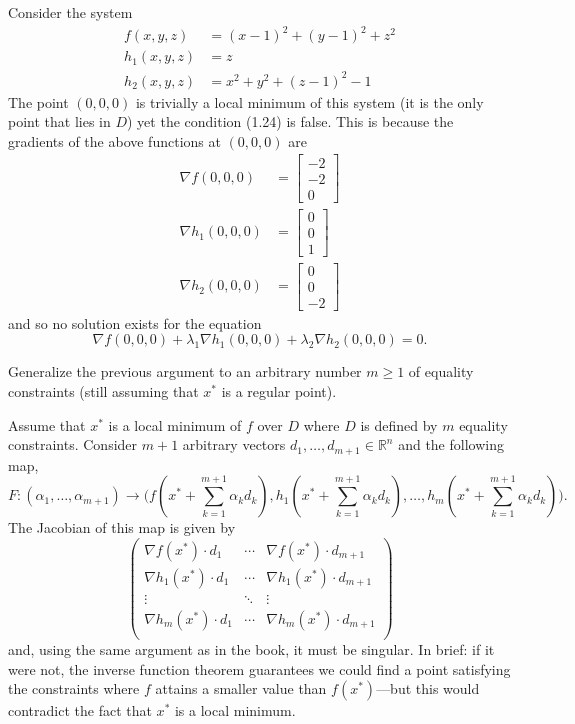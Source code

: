 \documentclass[../calculus-of-variations-and-optimal-control-theory.tex]{subfiles}
\begin{document}
\begin{questions}
\begin{solution}
	Consider the system
	\begin{align*}
		f(x, y, z) &= (x - 1)^2 + (y - 1)^2 + z^2 \\
		h_1(x, y, z) &= z \\
		h_2(x, y, z) &= x^2 + y^2 + (z - 1)^2 - 1
	\end{align*}
	The point $(0, 0, 0)$ is trivially a local minimum of this system (it is the only point that lies in $D$) yet the condition (1.24) is false. This is because the gradients of the above functions at $(0, 0, 0)$ are
	\begin{align*}
		\nabla f(0, 0, 0) &= \begin{bmatrix}
			-2 \\ -2 \\ 0
		\end{bmatrix} \\
		\nabla h_1(0, 0, 0) &= \begin{bmatrix}
			0 \\ 0 \\ 1
		\end{bmatrix} \\
		\nabla h_2(0, 0, 0) &= \begin{bmatrix}
			0 \\ 0 \\ -2
		\end{bmatrix}
	\end{align*}
	and so no solution exists for the equation
	\[
		\nabla f(0, 0, 0) + \lambda_1\nabla h_1(0, 0, 0) + \lambda_2\nabla h_2(0, 0, 0) = 0.
	\]
\end{solution}

\question Generalize the previous argument to an arbitrary number $m \geq 1$ of equality constraints (still assuming that $x^*$ is a regular point).

\begin{solution}
	Assume that $x^*$ is a local minimum of $f$ over $D$ where $D$ is defined by $m$ equality constraints. Consider $m+1$ arbitrary vectors $d_1,\dots,d_{m+1}\in\mathbb{R}^n$ and the following map,
	\[
		F : (\alpha_1,\dots,\alpha_{m+1}) \to \big(f(x^* + \textstyle\sum_{k=1}^{m+1}\alpha_kd_k), h_1(x^* + \sum_{k=1}^{m+1}\alpha_kd_k), \dots, h_{m}(x^* + \sum_{k=1}^{m+1}\alpha_kd_k)\big).
	\]
	The Jacobian of this map is given by
	\[
		\begin{pmatrix}
			\nabla f(x^*)\cdot d_1 & \cdots & \nabla f(x^*)\cdot d_{m+1} \\
			\nabla h_1(x^*)\cdot d_1 & \cdots & \nabla h_1(x^*)\cdot d_{m+1} \\
			\vdots & \ddots & \vdots \\
			\nabla h_m(x^*)\cdot d_1 & \cdots & \nabla h_m(x^*)\cdot d_{m+1} \\
		\end{pmatrix}
	\]
	and, using the same argument as in the book, it must be singular. In brief: if it were not, the inverse function theorem guarantees we could find a point satisfying the constraints where $f$ attains a smaller value than $f(x^*)$---but this would contradict the fact that $x^*$ is a local minimum.
	

\end{solution}
\end{questions}
\end{document}
